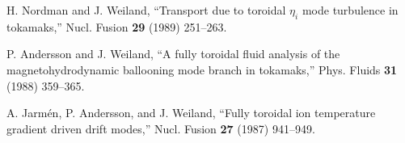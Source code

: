 \begin{thebibliography}{99}
 H. Nordman and J. Weiland, ``Transport due to toroidal
$\eta_i$ mode turbulence in tokamaks,'' Nucl. Fusion {\bf 29} (1989) 251--263.

 P. Andersson and J. Weiland, 
``A fully toroidal fluid analysis
of the magnetohydrodynamic ballooning mode branch in tokamaks,'' 
Phys. Fluids {\bf 31} (1988) 359--365.

 A. Jarm\'{e}n, P. Andersson, and J. Weiland, 
``Fully toroidal ion temperature gradient driven drift modes,'' 
Nucl. Fusion {\bf 27} (1987) 941--949.
\end{thebibliography}













